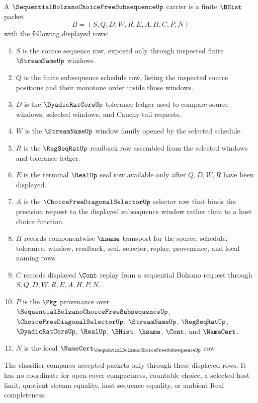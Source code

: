 \begin{definition}
\label{def:sequential-bolzano-choice-free-subsequence-carrier}
A $\SequentialBolzanoChoiceFreeSubsequenceUp$ carrier is a finite $\BHist$ packet
$$
B=(S,Q,D,W,R,E,A,H,C,P,N)
$$
with the following displayed rows:
\begin{enumerate}
\item $S$ is the source sequence row, exposed only through inspected finite $\StreamNameUp$ windows.
\item $Q$ is the finite subsequence schedule row, listing the inspected source positions and their monotone order inside those windows.
\item $D$ is the $\DyadicRatCoreUp$ tolerance ledger used to compare source windows, selected windows, and Cauchy-tail requests.
\item $W$ is the $\StreamNameUp$ window family opened by the selected schedule.
\item $R$ is the $\RegSeqRatUp$ readback row assembled from the selected windows and tolerance ledger.
\item $E$ is the terminal $\RealUp$ seal row available only after $Q,D,W,R$ have been displayed.
\item $A$ is the $\ChoiceFreeDiagonalSelectorUp$ selector row that binds the precision request to the displayed subsequence window rather than to a host choice function.
\item $H$ records componentwise $\hsame$ transport for the source, schedule, tolerance, window, readback, seal, selector, replay, provenance, and local naming rows.
\item $C$ records displayed $\Cont$ replay from a sequential Bolzano request through $S,Q,D,W,R,E,A,H,P,N$.
\item $P$ is the $\Pkg$ provenance over $\SequentialBolzanoChoiceFreeSubsequenceUp$, $\ChoiceFreeDiagonalSelectorUp$, $\StreamNameUp$, $\RegSeqRatUp$, $\DyadicRatCoreUp$, $\RealUp$, $\BHist$, $\hsame$, $\Cont$, and $\NameCert$.
\item $N$ is the local $\NameCert_{\SequentialBolzanoChoiceFreeSubsequenceUp}$ row.
\end{enumerate}
The classifier compares accepted packets only through these displayed rows. It has no coordinate for open-cover compactness, countable choice, a selected host limit, quotient stream equality, host sequence equality, or ambient Real completeness.
\end{definition}

